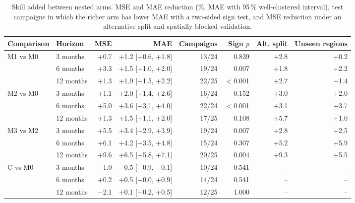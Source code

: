 \begin{table}[t]
\caption{Skill added between nested arms. MSE and MAE reduction (\%, MAE with 95\,\% well-clustered interval), test campaigns in which the richer arm has lower MAE with a two-sided sign test, and MSE reduction under an alternative split and spatially blocked validation.}
\label{tab:gains}
\centering\small
\begin{adjustbox}{max width=\textwidth}
\begin{tabular}{llrrrrrr}
\toprule
Comparison & Horizon & MSE & MAE & Campaigns & Sign $p$ & Alt. split & Unseen regions \\
\midrule
M1 vs M0 & 3 months & +0.7 & +1.2 [+0.6, +1.8] & 13/24 & 0.839 & +2.8 & +0.2 \\
 & 6 months & +3.3 & +1.5 [+1.0, +2.0] & 19/24 & 0.007 & +1.8 & +2.2 \\
 & 12 months & +1.3 & +1.9 [+1.5, +2.2] & 22/25 & $<$0.001 & +2.7 & $-$1.4 \\
M2 vs M0 & 3 months & +1.1 & +2.0 [+1.4, +2.6] & 16/24 & 0.152 & +3.0 & +2.0 \\
 & 6 months & +5.0 & +3.6 [+3.1, +4.0] & 22/24 & $<$0.001 & +3.1 & +3.7 \\
 & 12 months & +1.3 & +1.5 [+1.1, +2.0] & 17/25 & 0.108 & +5.7 & +1.0 \\
M3 vs M2 & 3 months & +5.5 & +3.4 [+2.9, +3.9] & 19/24 & 0.007 & +2.8 & +2.5 \\
 & 6 months & +6.1 & +4.2 [+3.5, +4.8] & 15/24 & 0.307 & +5.2 & +5.9 \\
 & 12 months & +9.6 & +6.5 [+5.8, +7.1] & 20/25 & 0.004 & +9.3 & +5.5 \\
C vs M0 & 3 months & $-$1.0 & $-$0.5 [$-$0.9, $-$0.1] & 10/24 & 0.541 & -- & -- \\
 & 6 months & +0.2 & +0.5 [+0.0, +0.9] & 14/24 & 0.541 & -- & -- \\
 & 12 months & $-$2.1 & +0.1 [$-$0.2, +0.5] & 12/25 & 1.000 & -- & -- \\
\bottomrule
\end{tabular}
\end{adjustbox}
\end{table}
